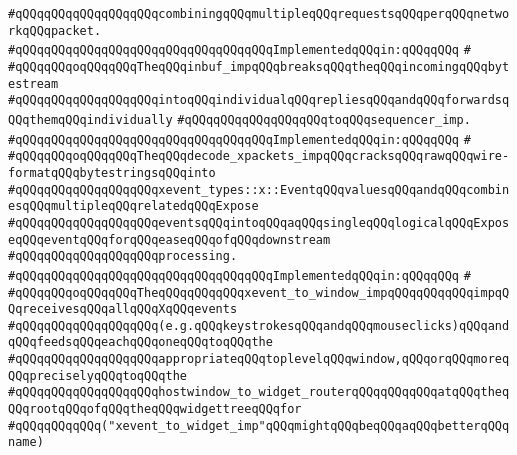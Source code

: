 \verb|#qQQqqQQqqQQqqQQqqQQqcombiningqQQqmultipleqQQqrequestsqQQqperqQQqnetworkqQQqpacket.|\newline
\verb|#qQQqqQQqqQQqqQQqqQQqqQQqqQQqqQQqqQQqImplementedqQQqin:qQQqqQQq|\newline
\verb|#|\newline
\verb|#qQQqqQQqoqQQqqQQqTheqQQqinbuf_impqQQqbreaksqQQqtheqQQqincomingqQQqbytestream|\newline
\verb|#qQQqqQQqqQQqqQQqqQQqintoqQQqindividualqQQqrepliesqQQqandqQQqforwardsqQQqthemqQQqindividually|\newline
\verb|#qQQqqQQqqQQqqQQqqQQqtoqQQqsequencer_imp.|\newline
\verb|#qQQqqQQqqQQqqQQqqQQqqQQqqQQqqQQqqQQqImplementedqQQqin:qQQqqQQq|\newline
\verb|#|\newline
\verb|#qQQqqQQqoqQQqqQQqTheqQQqdecode_xpackets_impqQQqcracksqQQqrawqQQqwire-formatqQQqbytestringsqQQqinto|\newline
\verb|#qQQqqQQqqQQqqQQqqQQqxevent_types::x::EventqQQqvaluesqQQqandqQQqcombinesqQQqmultipleqQQqrelatedqQQqExpose|\newline
\verb|#qQQqqQQqqQQqqQQqqQQqeventsqQQqintoqQQqaqQQqsingleqQQqlogicalqQQqExposeqQQqeventqQQqforqQQqeaseqQQqofqQQqdownstream|\newline
\verb|#qQQqqQQqqQQqqQQqqQQqprocessing.|\newline
\verb|#qQQqqQQqqQQqqQQqqQQqqQQqqQQqqQQqqQQqImplementedqQQqin:qQQqqQQq|\newline
\verb|#|\newline
\verb|#qQQqqQQqoqQQqqQQqTheqQQqqQQqqQQqxevent_to_window_impqQQqqQQqqQQqimpqQQqreceivesqQQqallqQQqXqQQqevents|\newline
\verb|#qQQqqQQqqQQqqQQqqQQq(e.g.qQQqkeystrokesqQQqandqQQqmouseclicks)qQQqandqQQqfeedsqQQqeachqQQqoneqQQqtoqQQqthe|\newline
\verb|#qQQqqQQqqQQqqQQqqQQqappropriateqQQqtoplevelqQQqwindow,qQQqorqQQqmoreqQQqpreciselyqQQqtoqQQqthe|\newline
\verb|#qQQqqQQqqQQqqQQqqQQqhostwindow_to_widget_routerqQQqqQQqqQQqatqQQqtheqQQqrootqQQqofqQQqtheqQQqwidgettreeqQQqfor|\newline
\verb|#qQQqqQQqqQQq("xevent_to_widget_imp"qQQqmightqQQqbeqQQqaqQQqbetterqQQqname)|\newline
